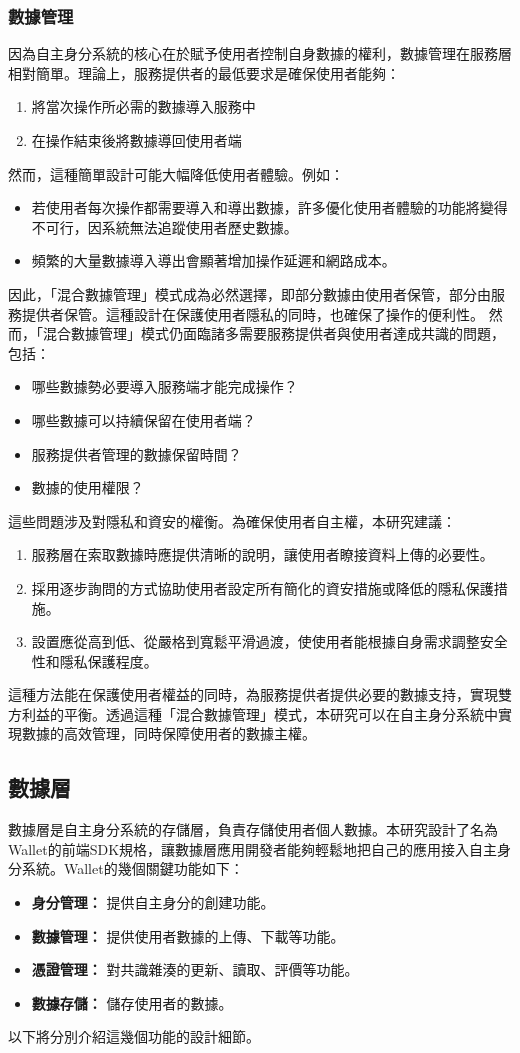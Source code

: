 \subsubsection{數據管理}
因為自主身分系統的核心在於賦予使用者控制自身數據的權利，數據管理在服務層相對簡單。理論上，服務提供者的最低要求是確保使用者能夠：
\begin{enumerate}
  \item 將當次操作所必需的數據導入服務中
  \item 在操作結束後將數據導回使用者端
\end{enumerate}
然而，這種簡單設計可能大幅降低使用者體驗。例如：
\begin{itemize}
  \item 若使用者每次操作都需要導入和導出數據，許多優化使用者體驗的功能將變得不可行，因系統無法追蹤使用者歷史數據。
  \item 頻繁的大量數據導入導出會顯著增加操作延遲和網路成本。
\end{itemize}
因此，「混合數據管理」模式成為必然選擇，即部分數據由使用者保管，部分由服務提供者保管。這種設計在保護使用者隱私的同時，也確保了操作的便利性。
然而，「混合數據管理」模式仍面臨諸多需要服務提供者與使用者達成共識的問題，包括：
\begin{itemize}
  \item 哪些數據勢必要導入服務端才能完成操作？
  \item 哪些數據可以持續保留在使用者端？
  \item 服務提供者管理的數據保留時間？
  \item 數據的使用權限？
\end{itemize}
這些問題涉及對隱私和資安的權衡。為確保使用者自主權，本研究建議：
\begin{enumerate}
  \item 服務層在索取數據時應提供清晰的說明，讓使用者瞭接資料上傳的必要性。
  \item 採用逐步詢問的方式協助使用者設定所有簡化的資安措施或降低的隱私保護措施。
  \item 設置應從高到低、從嚴格到寬鬆平滑過渡，使使用者能根據自身需求調整安全性和隱私保護程度。
\end{enumerate}
這種方法能在保護使用者權益的同時，為服務提供者提供必要的數據支持，實現雙方利益的平衡。透過這種「混合數據管理」模式，本研究可以在自主身分系統中實現數據的高效管理，同時保障使用者的數據主權。
\subsection{數據層}
數據層是自主身分系統的存儲層，負責存儲使用者個人數據。本研究設計了名為Wallet的前端SDK規格，讓數據層應用開發者能夠輕鬆地把自己的應用接入自主身分系統。Wallet的幾個關鍵功能如下：
\begin{itemize}
  \item \textbf{身分管理：} 提供自主身分的創建功能。
  \item \textbf{數據管理：} 提供使用者數據的上傳、下載等功能。
  \item \textbf{憑證管理：} 對共識雜湊的更新、讀取、評價等功能。
  \item \textbf{數據存儲：} 儲存使用者的數據。
\end{itemize}
以下將分別介紹這幾個功能的設計細節。
